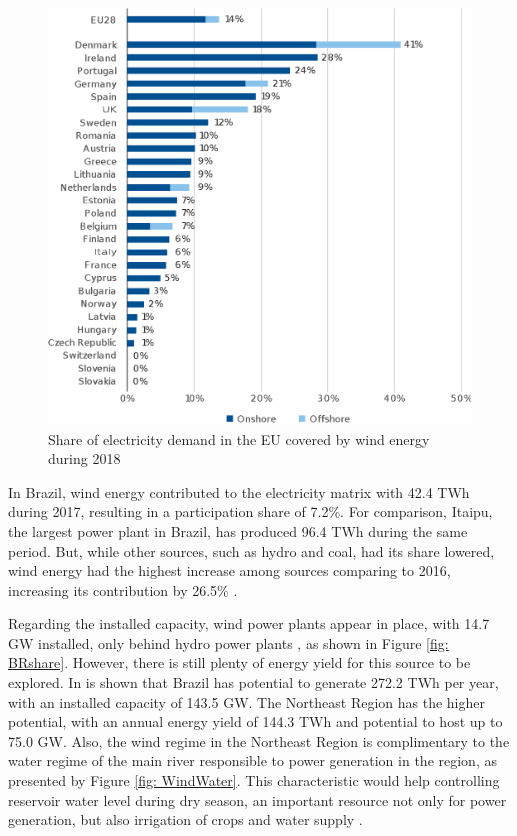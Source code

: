\begin{figure}[h]
	\caption{Share of electricity demand in the EU covered by wind energy during 2018}
	\begin{center}
		\includegraphics[scale=0.65]{Images/EUrank.eps}
	\end{center}
	\label{fig: EUrank}
\end{figure}

In Brazil, wind energy contributed to the electricity matrix with 42.4 TWh during 2017, resulting in a participation share of 7.2\%. For comparison, Itaipu, the largest power plant in Brazil, has produced 96.4 TWh during the same period. But, while other sources, such as hydro and coal, had its share lowered, wind energy had the highest increase among sources comparing to 2016, increasing its contribution by 26.5\% \cite{EPE2018}. 

Regarding the installed capacity, wind power plants appear in  place, with 14.7 GW installed, only behind hydro power plants \cite{ABEEolica2018}, as shown in Figure \ref{fig: BRshare}. However, there is still plenty of energy yield for this source to be explored. In \cite{Atlas2001} is shown that Brazil has potential to generate 272.2 TWh per year, with an installed capacity of 143.5 GW. The Northeast Region has the higher potential, with an annual energy yield of 144.3 TWh and potential to host up to 75.0 GW. Also, the wind regime in the Northeast Region is complimentary to the water regime of the main river responsible to power generation in the region, as presented by Figure \ref{fig: WindWater}. This characteristic would help controlling reservoir water level during dry season, an important resource not only for power generation, but also irrigation of crops and water supply \cite{ANEEL2005}.

